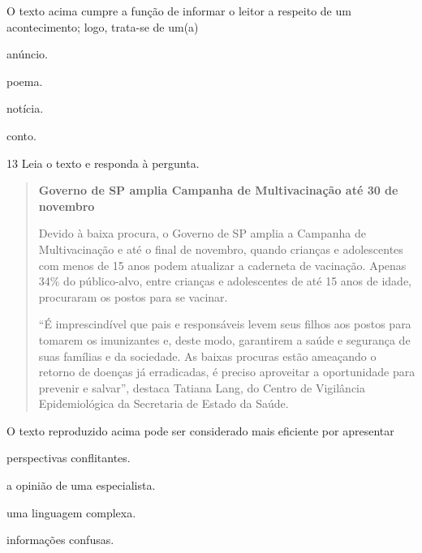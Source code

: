 
O texto acima cumpre a função de informar o leitor a respeito de um
acontecimento; logo, trata-se de um(a)

\begin{escolha}
  \item anúncio.

  \item poema.

  \item notícia.

  \item conto.
\end{escolha}



\num{13} Leia o texto e responda à pergunta.

\begin{quote}
\textbf{Governo de SP amplia Campanha de Multivacinação até 30 de novembro}

Devido à baixa procura, o Governo de SP amplia a Campanha de
Multivacinação e até o final de novembro, quando crianças e adolescentes
com menos de 15 anos podem atualizar a caderneta de vacinação. Apenas
34\% do público-alvo, entre crianças e adolescentes de até 15 anos de
idade, procuraram os postos para se vacinar.

``É imprescindível que pais e responsáveis levem seus filhos aos postos
para tomarem os imunizantes e, deste modo, garantirem a saúde e
segurança de suas famílias e da sociedade. As baixas procuras estão
ameaçando o retorno de doenças já erradicadas, é preciso aproveitar a
oportunidade para prevenir e salvar'', destaca Tatiana Lang, do Centro de
Vigilância Epidemiológica da Secretaria de Estado da Saúde.
\end{quote}


O texto reproduzido acima pode ser considerado mais eficiente por
apresentar

\begin{escolha}
  \item perspectivas conflitantes.

  \item a opinião de uma especialista.

  \item uma linguagem complexa.

  \item informações confusas.
\end{escolha}



